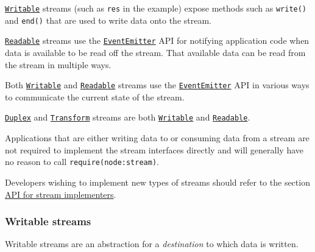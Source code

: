 \begin{Shaded}
\begin{Highlighting}[]
\NormalTok{(}\NormalTok{)}\OperatorTok{;}

\end{Highlighting}
\end{Shaded}

\hyperref[class-streamwritable]{\texttt{Writable}} streams (such as
\texttt{res} in the example) expose methods such as \texttt{write()} and
\texttt{end()} that are used to write data onto the stream.

\hyperref[class-streamreadable]{\texttt{Readable}} streams use the
\href{events.md\#class-eventemitter}{\texttt{EventEmitter}} API for
notifying application code when data is available to be read off the
stream. That available data can be read from the stream in multiple
ways.

Both \hyperref[class-streamwritable]{\texttt{Writable}} and
\hyperref[class-streamreadable]{\texttt{Readable}} streams use the
\href{events.md\#class-eventemitter}{\texttt{EventEmitter}} API in
various ways to communicate the current state of the stream.

\hyperref[class-streamduplex]{\texttt{Duplex}} and
\hyperref[class-streamtransform]{\texttt{Transform}} streams are both
\hyperref[class-streamwritable]{\texttt{Writable}} and
\hyperref[class-streamreadable]{\texttt{Readable}}.

Applications that are either writing data to or consuming data from a
stream are not required to implement the stream interfaces directly and
will generally have no reason to call
\texttt{require(\textquotesingle{}node:stream\textquotesingle{})}.

Developers wishing to implement new types of streams should refer to the
section \hyperref[api-for-stream-implementers]{API for stream
implementers}.

\subsubsection{Writable streams}\label{writable-streams}

Writable streams are an abstraction for a \emph{destination} to which
data is written.

